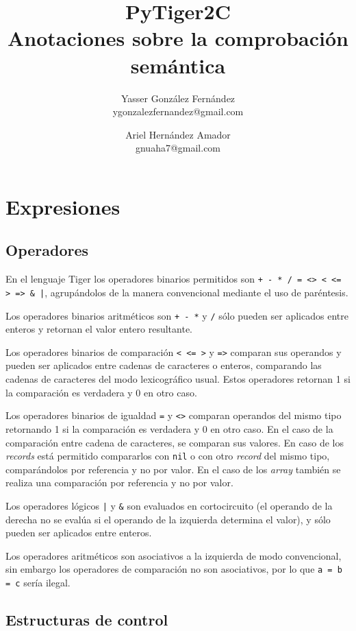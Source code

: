 \documentclass{article}
\title{
	\LARGE{PyTiger2C} \\
	\Large{Anotaciones sobre la comprobación semántica}
}
\author{
  	Yasser González Fernández \\
  	\small{ygonzalezfernandez@gmail.com}
  	\and
  	Ariel Hernández Amador \\
  	\small{gnuaha7@gmail.com}
}
\date{}
\begin{document}
\maketitle

\thispagestyle{empty}

\newpage

\setcounter{page}{1}

\section{Expresiones}

\subsection{Operadores}

En el lenguaje Tiger los operadores binarios permitidos son
\verb$+ - * / = <> < <= > => & |$, agrupándolos de la manera convencional
mediante el uso de paréntesis.

Los operadores binarios aritméticos son \verb|+ - *| y \verb|/| sólo pueden
ser aplicados entre enteros y retornan el valor entero resultante.

Los operadores binarios de comparación \verb|< <= >| y \verb|=>| comparan sus
operandos y pueden ser aplicados entre cadenas de caracteres o enteros, comparando
las cadenas de caracteres del modo lexicográfico usual. Estos operadores retornan
1 si la comparación es verdadera y 0 en otro caso.

Los operadores binarios de igualdad \verb|=| y \verb|<>| comparan operandos del
mismo tipo retornando 1 si la comparación es verdadera y 0 en otro caso. En el
caso de la comparación entre cadena de caracteres, se comparan sus valores. En
caso de los \emph{records} está permitido compararlos con \verb|nil| o con otro
\emph{record} del mismo tipo, comparándolos por referencia y no por valor. En el
caso de los \emph{array} también se realiza una comparación por referencia y no
por valor.

Los operadores lógicos \verb$|$ y \verb$&$ son evaluados en cortocircuito (el
operando de la derecha no se evalúa si el operando de la izquierda determina
el valor), y sólo pueden ser aplicados entre enteros.

Los operadores aritméticos son asociativos a la izquierda de modo convencional,
sin embargo los operadores de comparación no son asociativos, por lo que
\verb|a = b = c| sería ilegal.

\subsection{Estructuras de control}
\end{document}
